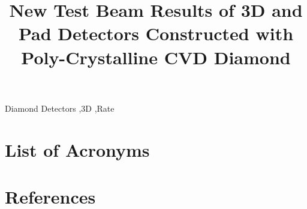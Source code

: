 \documentclass[review]{elsarticle}
\title{New Test Beam Results of 3D and Pad Detectors Constructed with Poly-Crystalline CVD Diamond}
\begin{document}
\begin{frontmatter}

	
	
	
	\begin{keyword}
	Diamond Detectors \sep 3D \sep Rate
	\end{keyword}

\end{frontmatter}

\linenumbers





\section*{List of Acronyms}


\section*{References}

\end{document}
